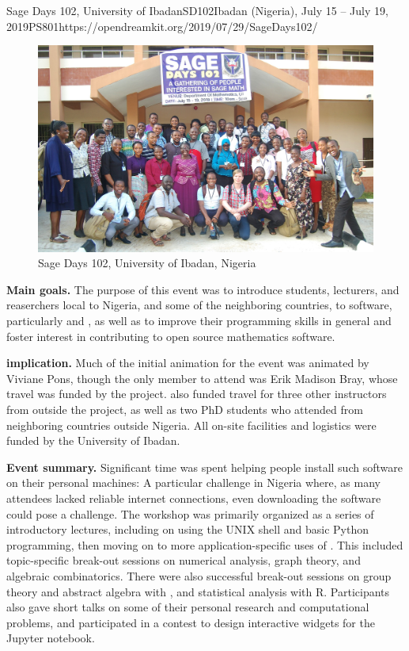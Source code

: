 \begin{event}{Sage Days 102, University of Ibadan}{SD102}{Ibadan (Nigeria), July 15 -- July 19, 2019}{PS}{80}{1}{https://opendreamkit.org/2019/07/29/SageDays102/}

\begin{figure}[ht]
  \includegraphics[width=.75\textwidth]{days102_group.jpg}
  \caption*{Sage Days 102, University of Ibadan, Nigeria}
\end{figure}

\textbf{Main goals.} The purpose of this event was to introduce students,
lecturers, and reaserchers local to Nigeria, and some of the
neighboring countries, to \ODK software, particularly \Sage and \GAP,
as well as to improve their programming skills in general and foster
interest in contributing to open source mathematics software.

\textbf{\ODK implication.} Much of the initial animation for the event was
animated by Viviane Pons, though the only \ODK member to attend was
Erik Madison Bray, whose travel was funded by the project.  \ODK also
funded travel for three other instructors from outside the project, as
well as two PhD students who attended from neighboring countries
outside Nigeria.  All on-site facilities and logistics were funded by the
University of Ibadan.

\textbf{Event summary.} Significant time was spent helping people install such
software on their personal machines: A particular challenge in Nigeria
where, as many attendees lacked reliable internet connections, even
downloading the software could pose a challenge.  The workshop was
primarily organized as a series of introductory lectures, including on
using the UNIX shell and basic Python programming, then moving on to
more application-specific uses of \Sage.  This included
topic-specific break-out sessions on numerical analysis, graph
theory, and algebraic combinatorics.  There were also successful
break-out sessions on group theory and abstract algebra with \GAP, and
statistical analysis with R. Participants also gave short talks on some
of their personal research and computational problems, and
participated in a contest to design interactive widgets for the Jupyter
notebook.


\end{event}
